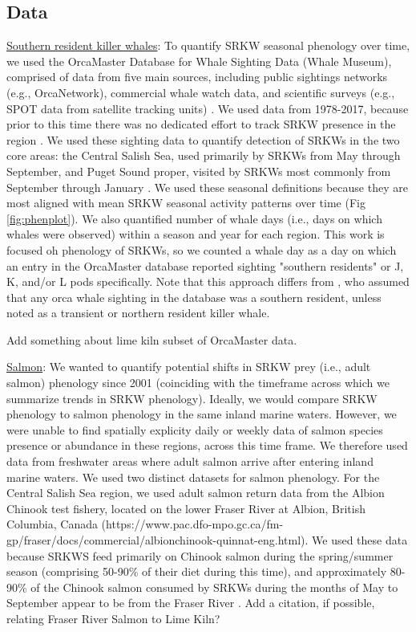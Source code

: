 \documentclass{article}
\begin{document}
\subsection* {Data}
\par \underline{Southern resident killer whales}: To quantify SRKW seasonal phenology over time, we used the OrcaMaster Database for Whale Sighting Data (Whale Museum), comprised of data from five main sources, including public sightings networks (e.g., OrcaNetwork), commercial whale watch data, and scientific surveys (e.g., SPOT data from satellite tracking units) \citep{olson2018}. We used data from 1978-2017, because prior to this time there was no dedicated effort to track SRKW presence in the region \citep{olson2018}. We used these sighting data to quantify %
detection of SRKWs in the two core areas: the Central Salish Sea, used primarily by SRKWs from May through September, and Puget Sound proper, visited by SRKWs most commonly from September through January \citep[Fig. 1][]{olson2018}. We used these seasonal definitions because they are most aligned with mean SRKW seasonal activity patterns over time (Fig \ref{fig:phenplot}).  We also quantified number of whale days (i.e., days on which whales were observed) within a season and year for each region. This work is focused oh phenology of SRKWs, so we counted a whale day as a day on which an entry in the OrcaMaster database reported sighting "southern residents" or J, K, and/or L pods specifically. Note that this approach differs from \citet{olson2018}, who assumed that any orca whale sighting in the database was a southern resident, unless noted as a transient or northern resident killer whale.  
\par Add something about lime kiln subset of OrcaMaster data.
\par \underline{Salmon}: We wanted to quantify potential shifts in SRKW prey (i.e., adult salmon) phenology since 2001 (coinciding with the timeframe across which we summarize trends in SRKW phenology). Ideally, we would compare SRKW phenology to salmon phenology in the same inland marine waters. However, we were unable to find spatially explicity daily or weekly data of salmon species presence or abundance in these regions, across this time frame. We therefore used data from freshwater areas where adult salmon arrive after entering inland marine waters. We used two distinct datasets for salmon phenology. For the Central Salish Sea region, we used adult salmon return data from the Albion Chinook test fishery, located  on the lower Fraser River at Albion, British Columbia, Canada (https://www.pac.dfo-mpo.gc.ca/fm-gp/fraser/docs/commercial/albionchinook-quinnat-eng.html). We used these data because SRKWS feed primarily on Chinook salmon during the spring/summer season (comprising 50-90\% of their diet during this time), and approximately 80-90\% of the Chinook salmon consumed by SRKWs during the months of May to September appear to be from the Fraser River \citep{hanson2010}. Add a citation, if possible, relating Fraser River Salmon to Lime Kiln?
\end{document}
